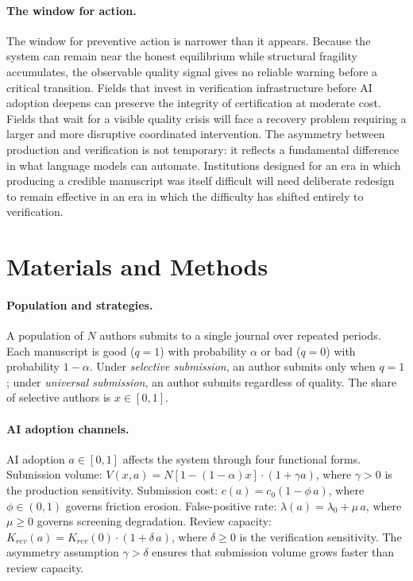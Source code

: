 \documentclass{article}
\begin{document}
\paragraph{The window for action.}
The window for preventive action is narrower than it appears.
Because the system can remain near the honest equilibrium while structural fragility accumulates, the observable quality signal gives no reliable warning before a critical transition.
Fields that invest in verification infrastructure before AI adoption deepens can preserve the integrity of certification at moderate cost.
Fields that wait for a visible quality crisis will face a recovery problem requiring a larger and more disruptive coordinated intervention.
The asymmetry between production and verification is not temporary: it reflects a fundamental difference in what language models can automate.
Institutions designed for an era in which producing a credible manuscript was itself difficult will need deliberate redesign to remain effective in an era in which the difficulty has shifted entirely to verification.

\section{Materials and Methods}
\label{sec:methods}

\paragraph{Population and strategies.}
A population of $N$ authors submits to a single journal over repeated periods.
Each manuscript is good ($q=1$) with probability $\alpha$ or bad ($q=0$) with probability $1-\alpha$.
Under \emph{selective submission}, an author submits only when $q=1$; under \emph{universal submission}, an author submits regardless of quality.
The share of selective authors is $x \in [0,1]$.

\paragraph{AI adoption channels.}
AI adoption $a \in [0,1]$ affects the system through four functional forms.
Submission volume: $V(x, a) = N[1-(1-\alpha)x]\cdot(1 + \gamma a)$, where $\gamma > 0$ is the production sensitivity.
Submission cost: $c(a) = c_0(1 - \phi\, a)$, where $\phi \in (0,1)$ governs friction erosion.
False-positive rate: $\lambda(a) = \lambda_0 + \mu\, a$, where $\mu \geq 0$ governs screening degradation.
Review capacity: $K_{rev}(a) = K_{rev}(0)\cdot(1 + \delta\, a)$, where $\delta \geq 0$ is the verification sensitivity.
The asymmetry assumption $\gamma > \delta$ ensures that submission volume grows faster than review capacity.
\end{document}

